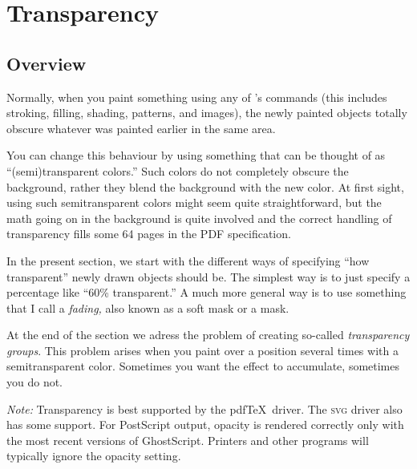 %
%
%


\section{Transparency}

\label{section-tikz-transparency}


\subsection{Overview}

Normally, when you paint something using any of \tikzname's commands
(this includes stroking, filling, shading, patterns, and images), the
newly painted objects totally obscure whatever was painted earlier in
the same area.

You can change this behaviour by using something that can be thought
of as ``(semi)transparent colors.'' Such colors do not completely
obscure the background, rather they blend the background with the new
color. At first sight, using such semitransparent colors might seem quite
straightforward, but the math going on in the background is quite
involved and the correct handling of transparency fills some 64 pages
in the PDF specification. 

In the present section, we start with the different ways of specifying
``how transparent'' newly drawn objects should be. The simplest way is
to just specify a percentage like ``60\% transparent.'' A much more
general way is to use something that I call a \emph{fading,} also
known as a soft mask or a mask.

At the end of the section we adress the problem of creating so-called
\emph{transparency groups}. This problem arises when you paint over a
position several times with a semitransparent color. Sometimes you
want the effect to accumulate, sometimes you do not.

\emph{Note:} Transparency is best supported by the pdf\TeX\
driver. The \textsc{svg} driver also has some support. For PostScript
output, opacity is rendered correctly only with the most recent
versions of GhostScript. Printers and other programs will typically
ignore the opacity setting. 




